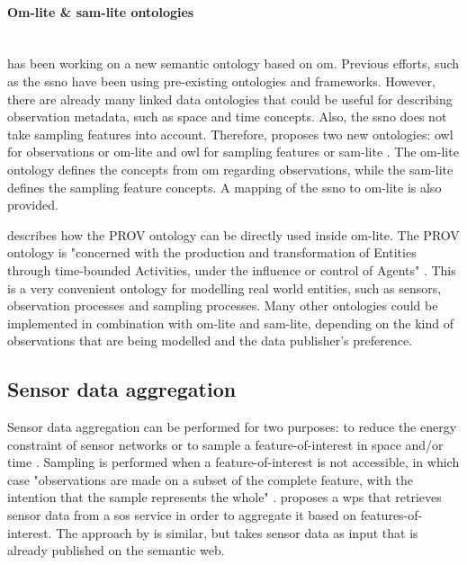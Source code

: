 \paragraph{Om-lite \& sam-lite ontologies} \mbox{}\\
\cite{SSW:Cox4} has been working on a new semantic ontology based on \ac{om}. Previous efforts, such as the \ac{ssno} have been using pre-existing ontologies and frameworks. However, there are already many linked data ontologies that could be useful for describing observation metadata, such as space and time concepts. Also, the \ac{ssno} does not take sampling features into account. Therefore, \cite{SSW:Cox4} proposes two new ontologies: \ac{owl} for observations or om-lite \citep{SSW:Cox3} and \ac{owl} for sampling features or sam-lite \citep{SSW:Cox2}. The om-lite ontology defines the concepts from \ac{om} regarding observations, while the sam-lite defines the sampling feature concepts. A mapping of the \ac{ssno} to om-lite is also provided.

\cite{SSW:Cox4} describes how the PROV ontology \citep{LD:PROV} can be directly used inside om-lite. The PROV ontology is "concerned with the production and transformation of Entities through time-bounded Activities, under the influence or control of Agents" \cite[p. 12]{SSW:Cox4}. This is a very convenient ontology for modelling real world entities, such as sensors, observation processes and sampling processes. Many other ontologies could be implemented in combination with om-lite and sam-lite, depending on the kind of observations that are being modelled and the data publisher's preference. 
 
\subsection{Sensor data aggregation}
Sensor data aggregation can be performed for two purposes: to reduce the energy constraint of sensor networks \citep{SW:Korteweg} or to sample a feature-of-interest in space and/or time \citep{SDI:INSPIRE2}. Sampling is performed when a feature-of-interest is not accessible, in which case "observations are made on a subset of the complete feature, with the intention that the sample represents the whole" \citep{SSW:Cox3}. \cite{SSW:Stasch3} proposes a \ac{wps} that retrieves sensor data from a \ac{sos} service in order to aggregate it based on features-of-interest. The approach by \cite{SSW:Stasch} is similar, but takes sensor data as input that is already published on the semantic web.

